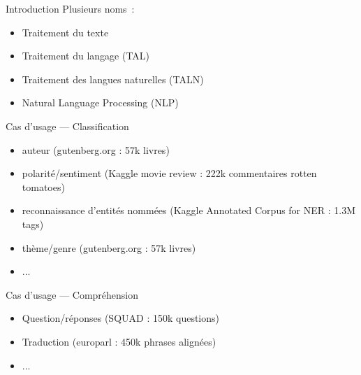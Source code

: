 \begin{frame}{Introduction}
  Plusieurs noms~:
  \begin{itemize}[<+->]
    \item Traitement du texte
    \item Traitement du langage (TAL)
    \item Traitement des langues naturelles (TALN)
    \item Natural Language Processing (NLP)
  \end{itemize}

\end{frame}

\begin{frame}{Cas d'usage --- Classification}
  \begin{itemize}
  \item auteur (gutenberg.org : 57k livres)
  \item polarité/sentiment (Kaggle movie review : 222k commentaires rotten tomatoes)
  \item reconnaissance d'entités nommées (Kaggle Annotated Corpus for NER : 1.3M tags)
  \item thème/genre (gutenberg.org : 57k livres)
  \item ...
  \end{itemize}
\end{frame}

\begin{frame}{Cas d'usage --- Compréhension}
  \begin{itemize}
  \item Question/réponses (SQUAD : 150k questions)
  \item Traduction (europarl : 450k phrases alignées)
  \item ...
  \end{itemize}
\end{frame}
